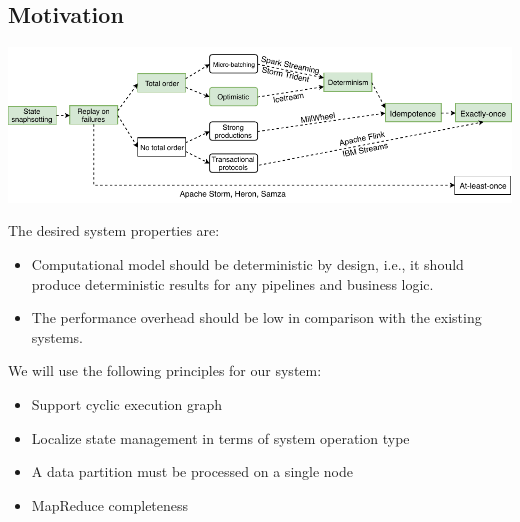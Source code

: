 \documentclass[a0,landscape]{a0poster}
\begin{document}
\begin{multicols*}{3}

\begin{abstract}
Exactly-once semantics without high latency overhead is still hard to achieve within state-of-the-art stream processing systems. We introduce a model providing for exactly-once using lightweight optimistic approach for obtaining determinism and idempotence. We show its feasibility with a prototype.
\end {abstract}

\section*{Motivation}

\begin{minipage}{\linewidth}
  \centering
  \includegraphics[width=\linewidth]{pics/roadmap}
\end{minipage}

The desired system properties are:

\begin{itemize}
  \item Computational model should be deterministic by design, i.e., it should produce deterministic results for any pipelines and business logic.
  \item The performance overhead should be low in comparison with the existing systems.
\end{itemize}

We will use the following principles for our system:

\begin{itemize}
  \item Support cyclic execution graph
  \item Localize state management in terms of system operation type
  \item A data partition must be processed on a single node
  \item MapReduce completeness
\end{itemize}


\end{multicols*}
\end{document}
